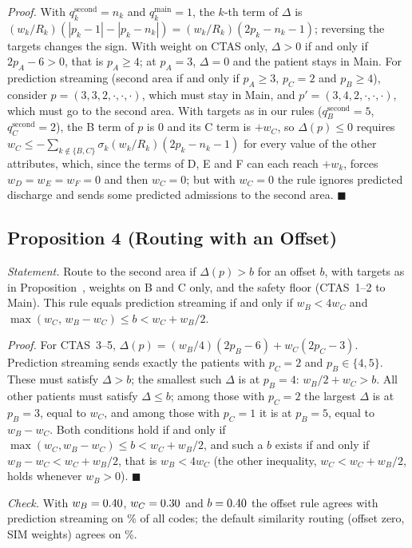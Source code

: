 \emph{Proof.} With $q^{\text{second}}_k=n_k$ and $q^{\text{main}}_k=1$, the $k$-th term of $\Delta$ is $(w_k/R_k)(|p_k-1|-|p_k-n_k|)=(w_k/R_k)(2p_k-n_k-1)$; reversing the targets changes the sign. With weight on CTAS only, $\Delta>0$ if and only if $2p_A-6>0$, that is $p_A\ge4$; at $p_A=3$, $\Delta=0$ and the patient stays in Main. For prediction streaming (second area if and only if $p_A\ge3$, $p_C=2$ and $p_B\ge4$), consider $p=(3,3,2,\cdot,\cdot,\cdot)$, which must stay in Main, and $p'=(3,4,2,\cdot,\cdot,\cdot)$, which must go to the second area. With targets as in our rules ($q^{\text{second}}_B=5$, $q^{\text{second}}_C=2$), the B term of $p$ is $0$ and its C term is $+w_C$, so $\Delta(p)\le0$ requires $w_C\le-\sum_{k\notin\{B,C\}}\sigma_k(w_k/R_k)(2p_k-n_k-1)$ for every value of the other attributes, which, since the terms of D, E and F can each reach $+w_k$, forces $w_D=w_E=w_F=0$ and then $w_C=0$; but with $w_C=0$ the rule ignores predicted discharge and sends some predicted admissions to the second area. \hfill$\blacksquare$

\subsection{Proposition 4 (Routing with an Offset)}

\emph{Statement.} Route to the second area if $\Delta(p)>b$ for an offset $b$, with targets as in Proposition~, weights on B and C only, and the safety floor (CTAS~1--2 to Main). This rule equals prediction streaming if and only if $w_B<4w_C$ and $\max(w_C,\,w_B-w_C)\le b<w_C+w_B/2$.

\emph{Proof.} For CTAS~3--5, $\Delta(p)=(w_B/4)(2p_B-6)+w_C(2p_C-3)$. Prediction streaming sends exactly the patients with $p_C=2$ and $p_B\in\{4,5\}$. These must satisfy $\Delta>b$; the smallest such $\Delta$ is at $p_B=4$: $w_B/2+w_C>b$. All other patients must satisfy $\Delta\le b$; among those with $p_C=2$ the largest $\Delta$ is at $p_B=3$, equal to $w_C$, and among those with $p_C=1$ it is at $p_B=5$, equal to $w_B-w_C$. Both conditions hold if and only if $\max(w_C,w_B-w_C)\le b<w_C+w_B/2$, and such a $b$ exists if and only if $w_B-w_C<w_C+w_B/2$, that is $w_B<4w_C$ (the other inequality, $w_C<w_C+w_B/2$, holds whenever $w_B>0$). \hfill$\blacksquare$

\emph{Check.} With $w_B=0.40$, $w_C=0.30$ and $b=0.40$ the offset rule agrees with prediction streaming on \PropFourAgree\% of all \NCodes{} codes; the default similarity routing (offset zero, SIM weights) agrees on \PropFourAgreeSimRoute\%.

